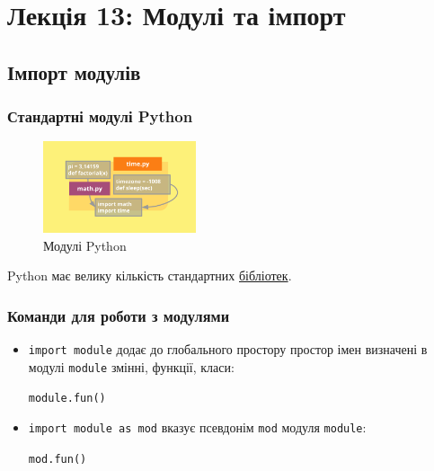 \section*{Лекція 13: Модулі та імпорт}
 
 \subsection{Імпорт модулів} 
\begin{frame}
\frametitle{Стандартні модулі Python}
\begin{figure}
  \begin{center}
    \includegraphics[width=0.4\textwidth,height=0.35\textheight]{pictures/import.png}
  \caption{Модулі Python}
\label{function}
  \end{center}
\end{figure}


Python має велику кількість стандартних \href{https://docs.python.org/3/library/}{бібліотек}.

\end{frame}

\begin{frame}
\frametitle{Команди для роботи з модулями}
\begin{itemize}
  \item<1-> \texttt{import module} додає до глобального простору простор імен визначені в модулі \texttt{module} змінні, функції, класи:
  \begin{center}
  \texttt{module.fun()}
  \end{center} 
  \item<2-> \texttt{import module as mod} вказує псевдонім \texttt{mod} модуля \texttt{module}:
  \begin{center}
  \texttt{mod.fun()}
  \end{center} 

\end{itemize}

\end{frame}

